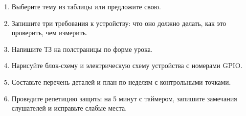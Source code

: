 \begin{tasks}
\begin{enumerate}
\item {} Выберите тему из таблицы или предложите свою.
\item {} Запишите три требования к устройству: что оно должно делать, как это проверить, чем измерить.
\item {} Напишите ТЗ на полстраницы по форме урока.
\item {} Нарисуйте блок-схему и электрическую схему устройства с номерами GPIO.
\item {} Составьте перечень деталей и план по неделям с контрольными точками.
\item {} Проведите репетицию защиты на 5 минут с таймером, запишите замечания слушателей и исправьте слабые места.
\end{enumerate}
\end{tasks}
